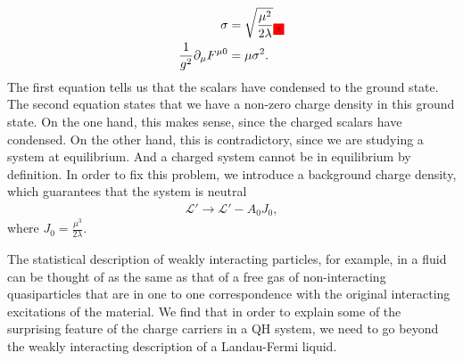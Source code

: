         \begin{align}
            \sigma &= \sqrt{\frac{\mu^2}{2\lambda}}  \label{eq:chem_pot_local_symmetry_eom1}\colorbox{red}{,} \\
            \frac{1}{g^2} \partial_{\mu} F^{\mu 0} &= \mu \sigma^2. \label{eq:chem_pot_local_symmetry_eom2}
        \end{align}
        The first equation tells us that the scalars have condensed to the ground state. The second equation states that we have a non-zero charge density in this ground state. On the one hand, this makes sense, since the charged scalars have condensed. On the other hand, this is contradictory, since we are studying a system at equilibrium. And a charged system cannot be in equilibrium by definition. In order to fix this problem, we introduce a background charge density, which guarantees that the system is neutral \colorbox{red}{ }
        \begin{align}
            \mathcal{L}' \rightarrow \mathcal{L}' - A_0 J_0,
        \end{align}
        where $J_0 = \frac{\mu^3}{2\lambda}$.

        The statistical description of weakly interacting particles, for example, in a fluid can be thought of as the same as that of a free gas of non-interacting quasiparticles that are in one to one correspondence with the original interacting excitations of the material. We find that in order to explain some of the surprising feature of the charge carriers in a QH system, we need to go beyond the weakly interacting description of a Landau-Fermi liquid.
